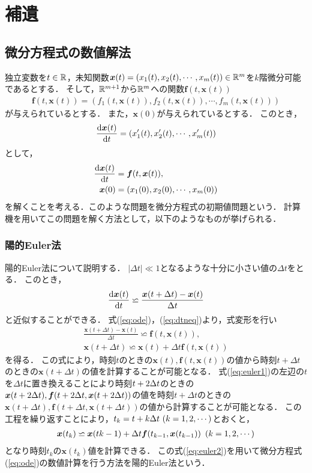 \chapter{補遺}
\label{chap:補遺}
\section{微分方程式の数値解法}
独立変数を$t \in \mathbb{R}$，未知関数$\bm{x}(t) = \left(x_1(t),x_2(t),\cdots,x_m(t)\right) \in \mathbb{R}^m$を$k$階微分可能であるとする．
そして，$\mathbb{R}^{m+1}$から$\mathbb{R}^m$への関数$\bm{f}(t,\bm{x}(t))$
\begin{align*}
    \bm{f}(t,\bm{x}(t)) = \left(f_1(t,\bm{x}(t)),f_2(t,\bm{x}(t)),\cdots,f_m(t,\bm{x}(t))\right)
\end{align*}
が与えられているとする．
また，$\bm{x}(0)$が与えられているとする．
このとき，
\begin{align*}
    \frac{\mathrm{d}\bm{x}(t)}{\mathrm{d}t} = \left(x_1^{\prime}(t),x_2^{\prime}(t),\cdots,x_m^{\prime}(t)\right)
\end{align*}
として，
\begin{align}
    \frac{\mathrm{d}\bm{x}(t)}{\mathrm{d}t} &= \bm{f}(t,\bm{x}(t)), \label{eq:ode} \\
    \bm{x}(0) &= \left(x_1(0),x_2(0),\cdots,x_m(0)\right)
\end{align}
を解くことを考える．このような問題を微分方程式の初期値問題という．
計算機を用いてこの問題を解く方法として，以下のようなものが挙げられる．
\subsection{陽的Euler法}
陽的Euler法について説明する．
$|\Delta t| \ll 1 $となるような十分に小さい値の$\Delta t$をとる．
このとき，
\begin{align}
    \label{eq:dtneq}
    \frac{\mathrm{d}\bm{x}(t)}{\mathrm{d}t} \backsimeq \frac{\bm{x}(t+\Delta t) - \bm{x}(t)}{\Delta t}
\end{align}
と近似することができる．
式(\ref{eq:ode})，(\ref{eq:dtneq})より，式変形を行い
\begin{align}
    \frac{\bm{x}(t + \Delta t) - \bm{x}(t)}{\Delta t} \backsimeq \bm{f}(t,\bm{x}(t)),\\
    \bm{x}(t + \Delta t) \backsimeq \bm{x}(t) + \Delta t \bm{f}(t,\bm{x}(t)) \label{eq:euler1}
\end{align}
を得る．
この式により，時刻$t$のときの$\bm{x}(t),\bm{f}(t,\bm{x}(t))$の値から時刻$t+\Delta t$のときの$\bm{x}(t+\Delta t)$の値を計算することが可能となる．
式(\ref{eq:euler1})の左辺の$t$を$\Delta t$に置き換えることにより時刻$t + 2\Delta t$のときの$\bm{x}(t+2\Delta t),\bm{f}(t+2\Delta t,\bm{x}(t+2\Delta t))$の値を時刻$t+\Delta t$のときの$\bm{x}(t+\Delta t),\bm{f}(t+\Delta t,\bm{x}(t+\Delta t))$の値から計算することが可能となる．
この工程を繰り返すことにより，$t_k = t + k\Delta t \ (k = 1,2,\cdots)$とおくと，
\begin{align}
    \bm{x}(t_k) \backsimeq \bm{x}(t{k-1}) + \Delta t\bm{f}(t_{k-1},\bm{x}(t_{k-1})) \ \left(k = 1,2,\cdots\right) \label{eq:euler2}
\end{align}
となり時刻$t_k$の$\bm{x}(t_k)$値を計算できる．
この式(\ref{eq:euler2})を用いて微分方程式(\ref{eq:ode})の数値計算を行う方法を陽的Euler法という．

